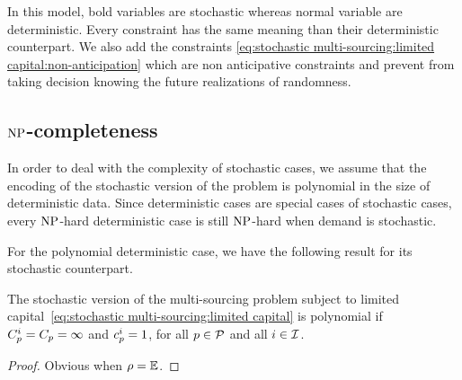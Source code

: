 In this model, bold variables are stochastic whereas normal variable are deterministic.
Every constraint has the same meaning than their deterministic counterpart.
We also add the constraints \eqref{eq:stochastic multi-sourcing:limited capital:non-anticipation} which are non anticipative constraints and prevent from taking decision knowing the future realizations of randomness.


\subsection{$\operatorname{NP}$-completeness}


In order to deal with the complexity of stochastic cases, we assume that the encoding of the stochastic version of the problem is polynomial in the size of deterministic data.
Since deterministic cases are special cases of stochastic cases, every $\operatorname{NP}$-hard deterministic case is still $\operatorname{NP}$-hard when demand is stochastic.

For the polynomial deterministic case, we have the following result for its stochastic counterpart.

\begin{prop}
The stochastic version of the multi-sourcing problem subject to limited capital~\eqref{eq:stochastic multi-sourcing:limited capital} is polynomial if $C_p^i=C_p=\infty$ and $c_p^i=1$, for all $p\in\mathcal{P}$ and all $i\in\mathcal{I}$.
\end{prop}

\begin{proof}
Obvious when $\rho=\operatorname{\mathbb{E}}$.


\tbc
\end{proof}



